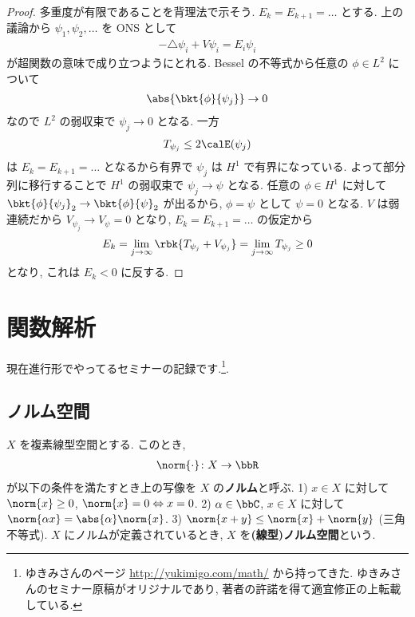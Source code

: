 \documentclass[openany, a4paper, oneside]{jsbook}
\begin{document}
\begin{proof}
多重度が有限であることを背理法で示そう.
$E_k = E_{k+1} = \dots$ とする.
上の議論から $\psi_1, \psi_2, \dots$ を ONS として
\begin{align}
 -\triangle \psi_i + V \psi_i
 =
 E_i \psi_i
\end{align}
が超関数の意味で成り立つようにとれる.
Bessel の不等式から任意の $\phi \in L^2$ について
\begin{align}
 \abs{\bkt{\phi}{\psi_j}} \to 0
\end{align}
なので $L^2$ の弱収束で $\psi_j \to 0$ となる.
一方
\begin{align}
 T_{\psi_j}
 \leq
 2 \calE (\psi_j)
\end{align}
は $E_k = E_{k+1} = \dots$ となるから有界で $\psi_j$ は $H^1$ で有界になっている.
よって部分列に移行することで $H^1$ の弱収束で $\psi_j \to \psi$ となる.
任意の $\phi \in H^1$ に対して $\bkt{\phi}{\psi_j}_2 \to \bkt{\phi}{\psi}_2$ が出るから,
$\phi = \psi$ として $ \psi = 0$ となる.
$V$ は弱連続だから $V_{\psi_j} \to V_{\psi} = 0$ となり,
$E_k = E_{k+1} = \dots$ の仮定から
\begin{align}
 E_k
 =
 \lim_{j \to \infty} \rbk{T_{\psi_j} + V_{\psi_j}}
 =
 \lim_{j \to \infty} T_{\psi_j}
 \geq 0
\end{align}
となり, これは $E_k < 0$ に反する.
\end{proof}

\chapter{関数解析}

現在進行形でやってるセミナーの記録です.\footnote{ゆきみさんのページ \url{http://yukimigo.com/math/} から持ってきた.
ゆきみさんのセミナー原稿がオリジナルであり, 著者の許諾を得て適宜修正の上転載している.}.
\section{ノルム空間}

\begin{defn}[ノルム]
 $X$ を複素線型空間とする.
 このとき,
 \begin{align}
  \norm{\cdot} \colon X \to \bbR
 \end{align}
 が以下の条件を満たすとき上の写像を $X$ の\textbf{ノルム}と呼ぶ.
 1) $x \in X$ に対して $\norm{x} \ge 0$, $\norm{x} = 0 \Leftrightarrow x = 0$.
 2) $\alpha \in \bbC$, $x \in X$ に対して $\norm{\alpha x} = \abs{\alpha} \norm{x}$.
 3) $\norm{x + y} \le \norm{x} + \norm{y}$ (三角不等式).
 $X$ にノルムが定義されているとき, $X$ を\textbf{(線型)ノルム空間}という.
\end{defn}
\end{document}
